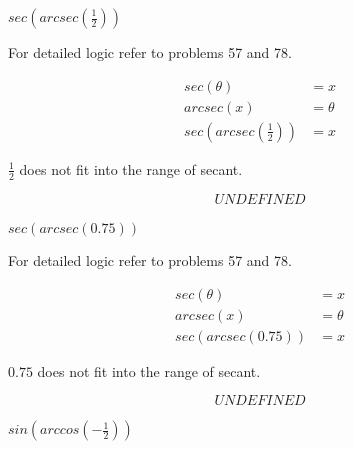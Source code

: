 \documentclass[10pt,letterpaper]{amspset}
\begin{document}
\begin{problem}[79]
    $sec \left(arcsec \left( \frac{1}{2} \right)\right)$
\end{problem}

\begin{solution}
    For detailed logic refer to problems 57 and 78. 
    
    \begin{align}
        sec(\theta) &= x \\
        arcsec(x) &= \theta \\
        sec \left(arcsec \left( \frac{1}{2} \right)\right) &= x 
    \end{align}
    
    $\frac{1}{2}$ does not fit into the range of secant.
    
    \[\boxed{UNDEFINED} \]
\end{solution}


\pagebreak


\begin{problem}[80]
    $sec \left(arcsec \left( 0.75 \right)\right)$
\end{problem}

\begin{solution}
    For detailed logic refer to problems 57 and 78. 
    
    \begin{align}
        sec(\theta) &= x \\
        arcsec(x) &= \theta \\
        sec \left(arcsec \left( 0.75 \right)\right) &= x 
    \end{align}
    
    $0.75$ does not fit into the range of secant.
    
    \[\boxed{UNDEFINED} \]
\end{solution}


\begin{problem}[131]
    $sin \left( arccos \left( -\frac{1}{2} \right) \right)$
\end{problem}
\end{document}
